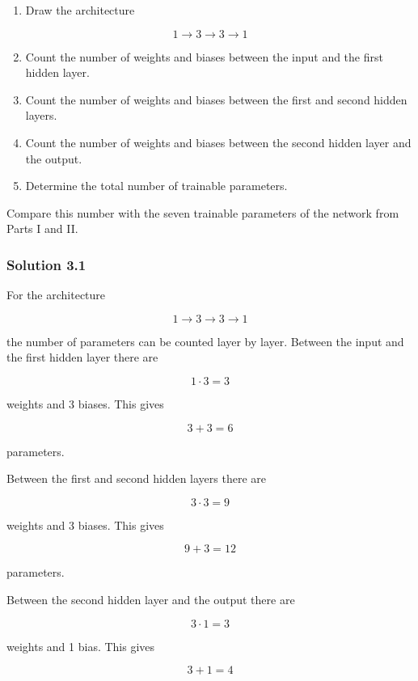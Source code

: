 \documentclass[10pt]{article}
\begin{document}
\begin{enumerate}
\item
Draw the architecture

\end{enumerate}
\[
1\rightarrow3\rightarrow3\rightarrow1
\]

\begin{enumerate}
\setcounter{enumi}{1}
\item
Count the number of weights and biases between the input and the first hidden layer.

\item
Count the number of weights and biases between the first and second hidden layers.

\item
Count the number of weights and biases between the second hidden layer and the output.

\item
Determine the total number of trainable parameters.

\end{enumerate}
Compare this number with the seven trainable parameters of the network from Parts I and II.

\begingroup\color{red}

\subsubsection*{Solution 3.1}
For the architecture

\[
1\rightarrow3\rightarrow3\rightarrow1
\]

the number of parameters can be counted layer by layer. Between the input and the first hidden layer there are

\[
1\cdot3=3
\]

weights and 3 biases. This gives

\[
3+3=6
\]

parameters.

Between the first and second hidden layers there are

\[
3\cdot3=9
\]

weights and 3 biases. This gives

\[
9+3=12
\]

parameters.

Between the second hidden layer and the output there are

\[
3\cdot1=3
\]

weights and 1 bias. This gives

\[
3+1=4
\]
\end{document}
